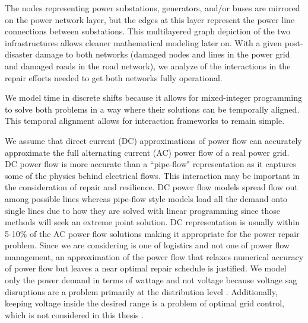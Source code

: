 The nodes representing power substations, generators, and/or buses are mirrored on the power network layer, but the edges at this layer represent the power line connections between substations. This multilayered graph depiction of the two infrastructures allows cleaner mathematical modeling later on. With a given post-disaster damage to both networks (damaged nodes and lines in the power grid and damaged roads in the road network), we analyze of the interactions in the repair efforts needed to get both networks fully operational.

We model time in discrete shifts because it allows for mixed-integer programming to solve both problems in a way where their solutions can be temporally aligned. This temporal alignment allows for interaction frameworks to remain simple.

We assume that direct current (DC) approximations of power flow can accurately approximate the full alternating current (AC) power flow of a real power grid. DC power flow is more accurate than a ``pipe-flow" representation as it captures some of the physics behind electrical flows. This interaction may be important in the consideration of repair and resilience. DC power flow models spread flow out among possible lines whereas pipe-flow style models load all the demand onto single lines due to how they are solved with linear programming since those methods will seek an extreme point solution. DC representation is usually within 5-10\% of the AC power flow solutions \cite{Frank2016} \cite{StottEA2009} making it appropriate for the power repair problem. Since we are considering is one of logistics and not one of power flow management, an approximation of the power flow that relaxes numerical accuracy of power flow but leaves a near optimal repair schedule is justified. We model only the power demand in terms of wattage and not voltage because voltage sag disruptions are a problem primarily at the distribution level \cite{LamoreeEA1994}. Additionally, keeping voltage inside the desired range is a problem of optimal grid control, which is not considered in this thesis \cite{MiretEA2013}.  

